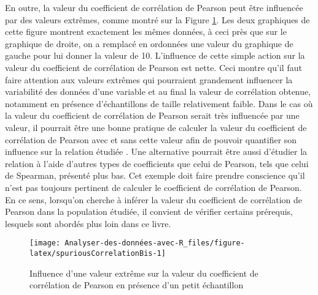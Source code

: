\documentclass[
]{book}
\begin{document}
En outre, la valeur du coefficient de corrélation de Pearson peut être influencée par des valeurs extrêmes, comme montré sur la Figure \ref{fig:spuriousCorrelationBis}. Les deux graphiques de cette figure montrent exactement les mêmes données, à ceci près que sur le graphique de droite, on a remplacé en ordonnées une valeur du graphique de gauche pour lui donner la valeur de 10. L'influence de cette simple action sur la valeur du coefficient de corrélation de Pearson est nette. Ceci montre qu'il faut faire attention aux valeurs extrêmes qui pourraient grandement influencer la variabilité des données d'une variable et au final la valeur de corrélation obtenue, notamment en présence d'échantillons de taille relativement faible. Dans le cas où la valeur du coefficient de corrélation de Pearson serait très influencée par une valeur, il pourrait être une bonne pratique de calculer la valeur du coefficient de corrélation de Pearson avec et sans cette valeur afin de pouvoir quantifier son influence sur la relation étudiée \autocite{halperinSpuriousCorrelationsCauses1986}. Une alternative pourrait être aussi d'étudier la relation à l'aide d'autres types de coefficients que celui de Pearson, tels que celui de Spearman, présenté plus bas. Cet exemple doit faire prendre conscience qu'il n'est pas toujours pertinent de calculer le coefficient de corrélation de Pearson. En ce sens, lorsqu'on cherche à inférer la valeur du coefficient de corrélation de Pearson dans la population étudiée, il convient de vérifier certains prérequis, lesquels sont abordés plus loin dans ce livre.

\begin{figure}

{\centering \texttt{[image: Analyser-des-données-avec-R\_files/figure-latex/spuriousCorrelationBis-1]} 

}

\caption{Influence d'une valeur extrême sur la valeur du coefficient de corrélation de Pearson en présence d'un petit échantillon}\label{fig:spuriousCorrelationBis}
\end{figure}
\end{document}
